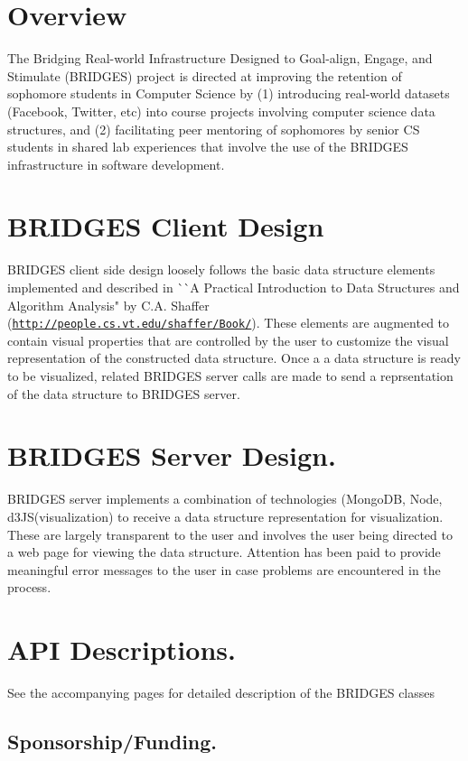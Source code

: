 \hypertarget{index_overview_sec}{}\section{Overview}\label{index_overview_sec}
The Bridging Real-\/world Infrastructure Designed to Goal-\/align, Engage, and Stimulate (B\+R\+I\+D\+G\+ES) project is directed at improving the retention of sophomore students in Computer Science by (1) introducing real-\/world datasets (Facebook, Twitter, etc) into course projects involving computer science data structures, and (2) facilitating peer mentoring of sophomores by senior CS students in shared lab experiences that involve the use of the B\+R\+I\+D\+G\+ES infrastructure in software development. \hypertarget{index_br_client}{}\section{B\+R\+I\+D\+G\+E\+S Client Design}\label{index_br_client}
B\+R\+I\+D\+G\+ES client side design loosely follows the basic data structure elements implemented and described in \`{}\`{}A Practical Introduction to Data Structures and Algorithm Analysis" by C.\+A. Shaffer (\href{http://people.cs.vt.edu/shaffer/Book/}{\tt http\+://people.\+cs.\+vt.\+edu/shaffer/\+Book/}). These elements are augmented to contain visual properties that are controlled by the user to customize the visual representation of the constructed data structure. Once a a data structure is ready to be visualized, related B\+R\+I\+D\+G\+ES server calls are made to send a reprsentation of the data structure to B\+R\+I\+D\+G\+ES server. \hypertarget{index_br_server}{}\section{B\+R\+I\+D\+G\+E\+S Server Design.}\label{index_br_server}
B\+R\+I\+D\+G\+ES server implements a combination of technologies (Mongo\+DB, Node, d3\+J\+S(visualization) to receive a data structure representation for visualization. These are largely transparent to the user and involves the user being directed to a web page for viewing the data structure. Attention has been paid to provide meaningful error messages to the user in case problems are encountered in the process. \hypertarget{index_api_sec}{}\section{A\+P\+I Descriptions.}\label{index_api_sec}
See the accompanying pages for detailed description of the B\+R\+I\+D\+G\+ES classes \hypertarget{index_sponsor_sec}{}\subsection{Sponsorship/\+Funding.}\label{index_sponsor_sec}
